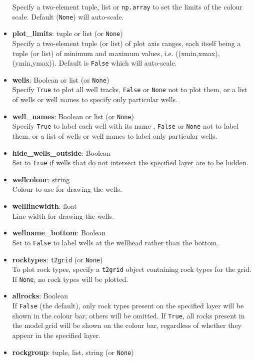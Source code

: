 \begin{itemize}
  Specify a two-element tuple, list or \texttt{np.array} to set the limits of the colour scale.  Default (\texttt{None}) will auto-scale.
\item \textbf{plot\_limits}: tuple or list (or \texttt{None})\\
  Specify a two-element tuple (or list) of plot axis ranges, each itself being a tuple (or list) of minimum and maximum values, i.e. ((xmin,xmax),(ymin,ymax)).  Default is \texttt{False} which will auto-scale.
\item \textbf{wells}: Boolean or list (or \texttt{None})\\
  Specify \texttt{True} to plot all well tracks, \texttt{False} or \texttt{None} not to plot them, or a list of wells or well names to specify only particular wells.
\item \textbf{well\_names}: Boolean or list (or \texttt{None})\\
  Specify \texttt{True} to label each well with its name , \texttt{False} or \texttt{None} not to label them, or a list of wells or well names to label only particular wells.
\item \textbf{hide\_wells\_outside}: Boolean\\
  Set to \texttt{True} if wells that do not intersect the specified layer are to be hidden.
\item \textbf{wellcolour}: string\\
  Colour to use for drawing the wells.
\item \textbf{welllinewidth}: float\\
  Line width for drawing the wells.
\item \textbf{wellname\_bottom}: Boolean\\
  Set to \texttt{False} to label wells at the wellhead rather than the bottom.
\item \textbf{rocktypes}: \texttt{t2grid} (or \texttt{None})\\
  To plot rock types, specify a \texttt{t2grid} object containing rock types for the grid.  If \texttt{None}, no rock types will be plotted.
\item \textbf{allrocks}: Boolean\\
  If \texttt{False} (the default), only rock types present on the specified layer will be shown in the colour bar; others will be omitted.  If \texttt{True}, all rocks present in the model grid will be shown on the colour bar, regardless of whether they appear in the specified layer.
\item \textbf{rockgroup}: tuple, list, string (or \texttt{None})\\

\end{itemize}
